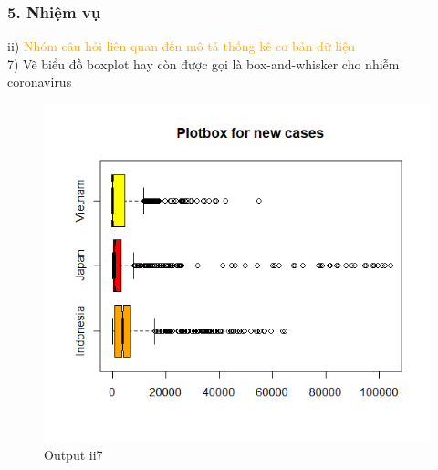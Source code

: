 \documentclass[english,10pt,table]{beamer}
\begin{document}
\begin{frame}[fragile]
\frametitle{5.  Nhiệm vụ}
	ii) \textcolor{orange}{Nhóm câu hỏi liên quan đến mô tả thống kê cơ bản dữ liệu}\\
	7) Vẽ biểu đồ boxplot hay còn được gọi là box-and-whisker cho nhiễm coronavirus
	\begin{figure}[h!]
	\begin{center}
		    \includegraphics[scale = 0.4]{Images/II/ii7.png}
		     \caption{Output ii7}
		\end{center}
		\end{figure}
\end{frame}
\end{document}
